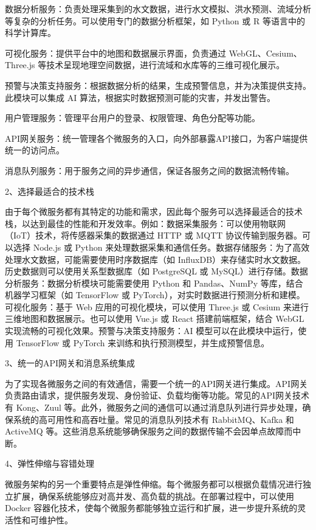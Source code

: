 数据分析服务：负责处理采集到的水文数据，进行水文模拟、洪水预测、流域分析等复杂的分析任务。可以使用专门的数据分析框架，如 Python 或 R 等语言中的科学计算库。

可视化服务：提供平台中的地图和数据展示界面，负责通过 WebGL、Cesium、Three.js 等技术呈现地理空间数据，进行流域和水库等的三维可视化展示。

预警与决策支持服务：根据数据分析的结果，生成预警信息，并为决策提供支持。此模块可以集成 AI 算法，根据实时数据预测可能的灾害，并发出警告。

用户管理服务：管理平台用户的登录、权限管理、角色分配等功能。

API网关服务：统一管理各个微服务的入口，向外部暴露API接口，为客户端提供统一的访问点。

消息队列服务：用于服务之间的异步通信，保证各服务之间的数据流畅传输。

2、选择最适合的技术栈

由于每个微服务都有其特定的功能和需求，因此每个服务可以选择最适合的技术栈，以达到最佳的性能和开发效率。例如：数据采集服务：可以使用物联网（IoT）技术，将传感器采集的数据通过 HTTP 或 MQTT 协议传输到服务器。可以选择 Node.js 或 Python 来处理数据采集和通信任务。数据存储服务：为了高效处理水文数据，可能需要使用时序数据库（如 InfluxDB）来存储实时水文数据。历史数据则可以使用关系型数据库（如 PostgreSQL 或 MySQL）进行存储。数据分析服务：数据分析模块可能需要使用 Python 和 Pandas、NumPy 等库，结合机器学习框架（如 TensorFlow 或 PyTorch），对实时数据进行预测分析和建模。可视化服务：基于 Web 应用的可视化模块，可以使用 Three.js 或 Cesium 来进行三维地图和数据展示。也可以使用 Vue.js 或 React 搭建前端框架，结合 WebGL 实现流畅的可视化效果。预警与决策支持服务：AI 模型可以在此模块中运行，使用 TensorFlow 或 PyTorch 来训练和执行预测模型，并生成预警信息。

3、统一的API网关和消息系统集成

为了实现各微服务之间的有效通信，需要一个统一的API网关进行集成。API网关负责路由请求，提供服务发现、身份验证、负载均衡等功能。常见的API网关技术有 Kong、Zuul 等。此外，微服务之间的通信可以通过消息队列进行异步处理，确保系统的高可用性和高吞吐量。常见的消息队列技术有 RabbitMQ、Kafka 和 ActiveMQ 等。这些消息系统能够确保服务之间的数据传输不会因单点故障而中断。

4、弹性伸缩与容错处理

微服务架构的另一个重要特点是弹性伸缩。每个微服务都可以根据负载情况进行独立扩展，确保系统能够应对高并发、高负载的挑战。在部署过程中，可以使用 Docker 容器化技术，使每个微服务都能够独立运行和扩展，进一步提升系统的灵活性和可维护性。

